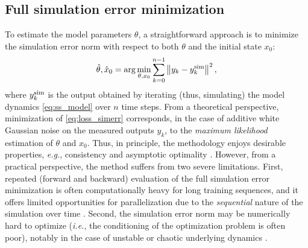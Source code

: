 \documentclass{article}
\newcommand{\nsamp}{n}
\newcommand{\norm}[1]{\left\lVert#1\right\rVert}
\newcommand{\simul}[1]{{#1}^{\rm sim}}
\begin{document}
\subsection{Full simulation error minimization}
To estimate the model parameters $\theta$, a straightforward approach is to minimize the simulation error norm with respect to both $\theta$ and the initial state $x_0$:
\begin{equation}
\label{eq:loss_simerr}
 \hat \theta, \hat x_0 = \arg \min_{\theta, x_0} 
 \sum_{k=0}^{\nsamp-1} \norm{y_k - \simul{y}_k}^2,
\end{equation}
where $\simul{y}_k$ is the output obtained by iterating (thus, simulating) the model dynamics \eqref{eq:ss_model} over $\nsamp$ time steps.
From a theoretical perspective, minimization
of \eqref{eq:loss_simerr} corresponds, in the case of additive white Gaussian noise on the measured outputs $y_k$, to the \emph{maximum likelihood} estimation
of $\theta$ and $x_0$. Thus, in principle, the methodology enjoys desirable properties, \emph{e.g.}, consistency and asymptotic optimality \cite{hastie2009elements}. However, from a practical perspective, the method suffers from two severe limitations. 
First, repeated (forward and backward) evaluation of the full simulation error minimization is often computationally heavy for long training sequences, and it offers limited opportunities for parallelization due to the \emph{sequential} nature of the simulation over time \cite{forgione2020model}. Second, the simulation error norm may be numerically hard to optimize (\emph{i.e.}, the conditioning of the optimization problem is often poor), notably in the case of unstable or chaotic underlying dynamics \cite{ribeiro2020smoothness}.


\end{document}
